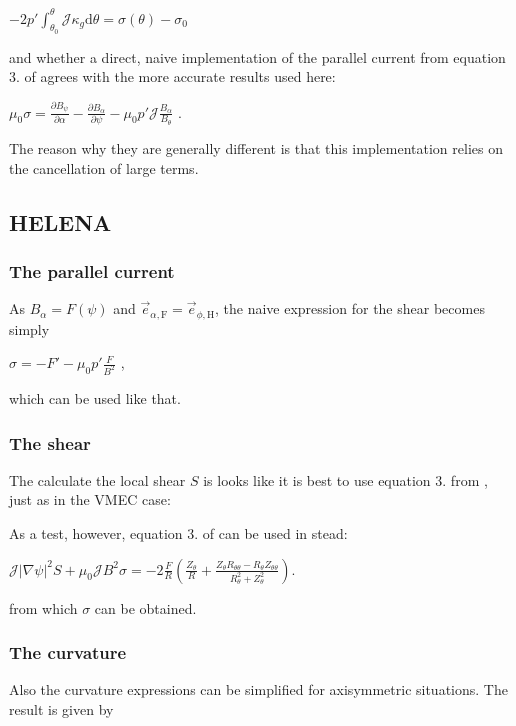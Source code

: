 $ -2 p' \int_{\theta_0}^\theta \mathcal{J} \kappa_g \text{d}{\theta} = \sigma\left(\theta\right) - \sigma_0$

and whether a direct, naive implementation of the parallel current from equation 3. of \cite{Weyens3D} agrees with the more accurate results used here\+:

$\mu_0 \sigma = \frac{\partial B_\psi}{\partial \alpha} - \frac{\partial B_\alpha}{\partial \psi} - \mu_0 p' \mathcal{J} \frac{B_\alpha}{B_\theta}$ .

The reason why they are generally different is that this implementation relies on the cancellation of large terms.

\subsection*{H\+E\+L\+E\+NA }

\subsubsection*{The parallel current }

As $B_\alpha = F\left(\psi\right)$ and $\vec{e}_{\alpha,\text{F}} = \vec{e}_{\phi,\text{H}}$, the naive expression for the shear becomes simply

$\sigma = -F' - \mu_0 p' \frac{F}{B^2}$ ,

which can be used like that.

\subsubsection*{The shear }

The calculate the local shear $S$ is looks like it is best to use equation 3. from \cite{Weyens3D} , just as in the V\+M\+EC case\+:

As a test, however, equation 3. of \cite{Weyens3D} can be used in stead\+:

$\mathcal{J}\left|\nabla \psi\right|^2 S + \mu_0 \mathcal{J}B^2 \sigma = - 2 \frac{F}{R} \left( \frac{Z_\theta}{R} + \frac{Z_\theta R_{\theta\theta} - R_\theta Z_{\theta\theta}}{R_\theta^2 + Z_\theta^2} \right)$.

from which $\sigma$ can be obtained.

\subsubsection*{The curvature }

Also the curvature expressions can be simplified for axisymmetric situations. The result is given by

